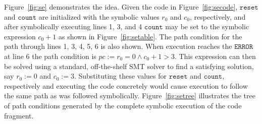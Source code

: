Figure~\ref{fig:se} demonstrates the idea. 
Given the code in
Figure~\ref{fig:secode}, $\mathtt{reset}$ and $\mathtt{count}$ are initialized
with the symbolic values $r_0$ and $c_0$, respectively, and after symbolically
executing lines 1, 3, and 4 $\mathtt{count}$ may be set to the symbolic expression $c_0 +
1$ as shown in Figure~\ref{fig:setable}. The
path condition for the path through lines 1, 3, 4, 5, 6 is also shown. When execution
reaches the $\mathtt{ERROR}$ at line 6 the path condition is $\mathit{pc} := r_0
= 0 \wedge c_0 + 1 > 3$. This expression can then be solved using a standard,
off-the-shelf SMT solver to find a satisfying solution, say $r_0 := 0$ and $c_0
:= 3$. Substituting these values for $\mathtt{reset}$ and $\mathtt{count}$,
respectively and executing the code concretely would cause execution to follow
the same path as was followed symbolically. Figure~\ref{fig:setree} illustrates
the tree of path conditions generated by the complete symbolic execution of the
code fragment.

